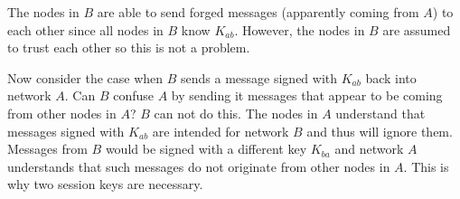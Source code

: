 \documentclass{article}
\begin{document}
The nodes in $B$ are able to send forged messages (apparently coming from $A$) to each other
since all nodes in $B$ know $K_{ab}$. However, the nodes in $B$ are assumed to trust each other
so this is not a problem.

Now consider the case when $B$ sends a message signed with $K_{ab}$ back into network $A$. Can
$B$ confuse $A$ by sending it messages that appear to be coming from other nodes in $A$? $B$ can
not do this. The nodes in $A$ understand that messages signed with $K_{ab}$ are intended for
network $B$ and thus will ignore them. Messages from $B$ would be signed with a different key
$K_{ba}$ and network $A$ understands that such messages do not originate from other nodes in
$A$. This is why two session keys are necessary.



\end{document}
